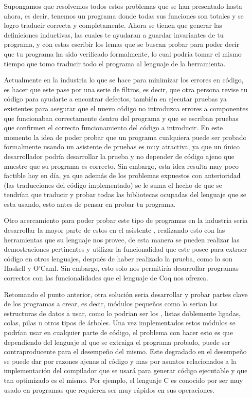 Supongamos que resolvemos todos estos problemas que se han presentado hasta ahora, es decir,
tenemos un programa donde todas sus funciones son totales y se logro traducir correcta y
completamente. Ahora se tienen que generar las definiciones inductivas, las cuales te ayudaran a
guardar invariantes de tu programa, y con estas escribir los lemas que se buscan probar para poder
decir que tu programa ha sido verificado formalmente, lo cual podría tomar el mismo tiempo que tomo
traducir todo el programa al lenguaje de la herramienta.

Actualmente en la industria lo que se hace para minimizar los errores en c\'odigo, es hacer que este pase por una serie de filtros, es decir, que otra persona revise tu c\'odigo para ayudarte a encontrar defectos, también en ejecutar pruebas ya existentes para asegurar que el nuevo c\'odigo no introduzca errores a componentes que funcionaban correctamente dentro del programa
y que se escriban pruebas que confirmen el correcto funcionamiento del c\'odigo a introducir.
En este momento la idea de poder probar
que un programa cualquiera puede ser probado formalmente usando un asistente de pruebas es muy
atractiva, ya que un \'unico desarrollador podr\'ia desarrollar la prueba y no depender de código ajeno que muestre que su programa es correcto. Sin embargo, esta idea resulta muy poco factible hoy en día, ya que además de los problemas expuestos con
anterioridad (las traducciones del c\'odigo implementado) se le suma el hecho de que se tendrían que traducir y probar todas las
bibliotecas ocupadas del lenguaje que se esta usando, esto antes de pensar en probar tu programa.

Otro acercamiento para poder probar este tipo de programas en la industria seria desarrollar la
mayor parte de estos en el asistente {\coq}, realizando esto con las herramientas que su lenguaje nos provee, de esta manera se pueden realizar
las demostraciones pertinentes y utilizar la funcionalidad que este posee para extraer c\'odigo en
otros lenguajes, después de haber realizado la prueba, como lo son Haskell y O'Caml. Sin embargo, esto solo nos permitiría desarrollar
programas correctos con las funcionalidades que el lenguaje de Coq nos ofrezca.

Retomando el punto anterior, otra soluci\'on seria desarrollar y probar partes clave de los programas a crear, es decir, 
m\'odulos pequeños como lo serian las estructuras de datos a usar, como lo podrian ser los {\arns}, listas doblemente 
ligadas, colas, pilas u otros tipos de \'arboles. Una vez implementados estos m\'odulos se podrían usar en cualquier 
parte de c\'odigo, el problema con hacer esto es que dependiendo del lenguaje al que se extraiga el programa 
probado, puede ser contraproducente para el desempeño del mismo. Este degradado en el desempeño se puede dar por razones
ajenas al c\'odigo y mas por asuntos relacionados a la implementaci\'on del compilador que se usar\'a para generar 
c\'odigo ejecutable y que tan optimizado es el mismo. Por ejemplo, el lenguaje C es conocido por ser muy 
usado en programas que requieren ser muy rápidos en sus operaciones.

